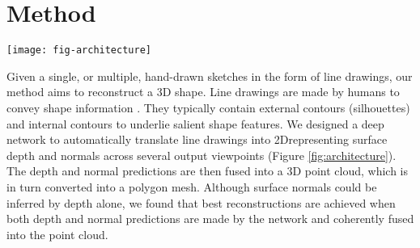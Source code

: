 \documentclass[10pt, conference, compsocconf]{IEEEtran}
\begin{document}
\vspace{-5mm}
\section{Method}
\label{sec:method}
\begin{figure*}[t]
\centering
\texttt{[image: fig-architecture]}
\vspace{-2mm}
\caption{Our method takes  line drawings  as input and converts them into multi-view  surface depth and normals maps from several output viewpoints via an encoder-multi-view-decoder architecture. The maps are fused into a coherent 3D point cloud, which is then converted into a surface mesh. Finally, the mesh can be further fine-tuned to match the input drawings more precisely through geometric  deformations. }
\vspace{-5mm}
\label{fig:architecture}
\end{figure*}\vspace{-5mm}
Given a single, or multiple, hand-drawn sketches in the form of line drawings, our method aims to reconstruct a 3D shape. Line drawings are made by humans to convey shape information \cite{decarlo2003suggestive,cole2009well}. They typically contain  external contours (silhouettes) and internal contours to underlie salient shape features. We designed a deep network to automatically translate line drawings into 2D\images representing surface depth and normals across several output viewpoints (Figure \ref{fig:architecture}). The depth and normal predictions are  then fused into a  3D point cloud, which is in turn converted into a polygon mesh. Although surface normals could be inferred
by depth alone, we found that best reconstructions are achieved when both depth and normal predictions are made by the network and coherently fused into the  point cloud. 
\end{document}
